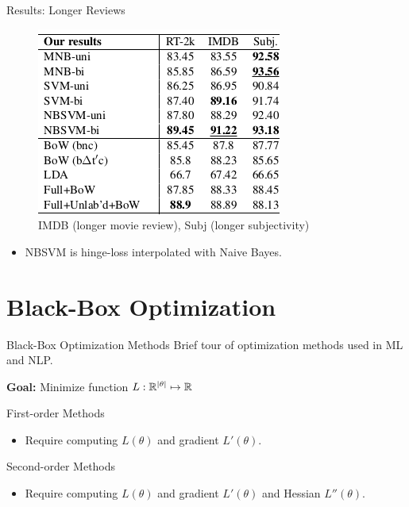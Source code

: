 \documentclass{beamer}
\begin{document}
\begin{frame}{Results: Longer Reviews}
  \begin{figure}
    \centering
    \includegraphics{svm}
    \caption{IMDB (longer movie review), Subj (longer subjectivity)}
  \end{figure}

  \begin{itemize}
  \item NBSVM is hinge-loss interpolated with Naive Bayes.
  \end{itemize}
\end{frame}


\section{Black-Box Optimization}


\begin{frame}{Black-Box Optimization Methods}
  Brief tour of optimization methods used in ML and NLP.
  

  \textbf{Goal:} Minimize function $L: \mathbb{R}^{|\theta|} \mapsto \mathbb{R} $

  First-order Methods
  \begin{itemize}
  \item Require computing $L(\theta)$ and gradient $L'(\theta)$.
  \end{itemize}

  Second-order Methods
  \begin{itemize}
  \item  Require computing $L(\theta)$ and gradient $L'(\theta)$ and Hessian $L''(\theta)$.
  \end{itemize}


\end{frame}
\end{document}
